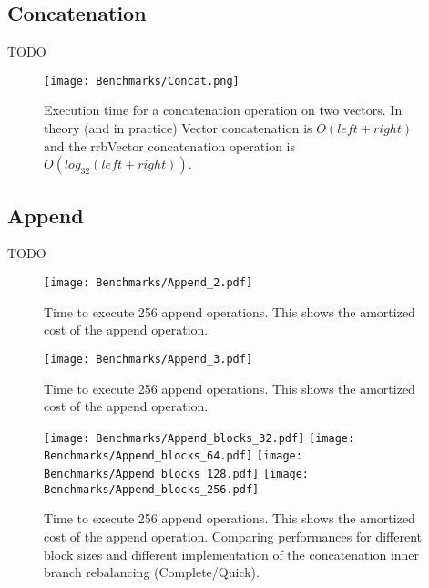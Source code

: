 \FloatBarrier

\subsection{Concatenation}
\color{red} TODO \color{black}

\begin{figure}[h!]
  \centering
  \texttt{[image: Benchmarks/Concat.png]}
  \label{ConcatBenchmarks}
  \caption{Execution time for a concatenation operation on two vectors. In theory (and in practice) Vector concatenation is $O(left + right)$ and the rrbVector concatenation operation is $O(log_{32}(left + right))$.}
\end{figure}

\FloatBarrier

\subsection{Append}

\color{red} TODO \color{black}

\begin{figure}[h!]
  \centering
  \texttt{[image: Benchmarks/Append\_2.pdf]}
  \label{Append2Benchmarks}
  \caption{Time to execute 256 append operations. This shows the amortized cost of the append operation.}
\end{figure}

\begin{figure}[h!]
  \centering
  \texttt{[image: Benchmarks/Append\_3.pdf]}
  \label{Append3Benchmarks}
  \caption{Time to execute 256 append operations. This shows the amortized cost of the append operation.}
\end{figure}

\begin{figure}[h!]
  \centering
  \texttt{[image: Benchmarks/Append\_blocks\_32.pdf]}
  \texttt{[image: Benchmarks/Append\_blocks\_64.pdf]}
  \texttt{[image: Benchmarks/Append\_blocks\_128.pdf]}
  \texttt{[image: Benchmarks/Append\_blocks\_256.pdf]}
  \label{IterationBlocksBenchmarks}
  \caption{Time to execute 256 append operations. This shows the amortized cost of the append operation. Comparing performances for different block sizes and different implementation of the concatenation inner branch rebalancing (Complete/Quick).}
\end{figure}

